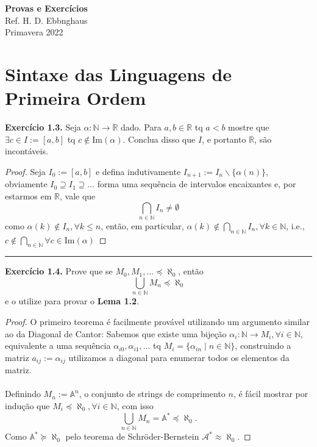 \documentclass[11pt]{article}
\theoremstyle{definition}
\newcommand{\mc}[1]{\mathcal{#1}}
\newcommand{\mbb}[1]{\mathbb{#1}}
\begin{document}
\setcounter{section}{0}
\thispagestyle{empty}

\begin{center}
{\LARGE \bf Provas e Exercícios}\\
{\large Ref. H. D. Ebbnghaus}\\
Primavera 2022
\end{center}

\tableofcontents

\section{Sintaxe das Linguagens de Primeira Ordem}

\textbf{Exercício 1.3.}
Seja $\alpha:\mbb{N}\to\mbb{R}$ dado. Para $a,b\in\mbb{R}$ tq $a<b$ mostre que $\exists c\in I:=[a,b]$ tq $c\notin\text{Im}(\alpha)$. Conclua disso que $I$, e portanto $\mbb{R}$, são incontáveis.
\begin{proof}
    Seja $I_0:=[a,b]$ e defina indutivamente $I_{n+1}:=I_n\backslash\{\alpha(n)\}$, obviamente $I_0 \supseteq I_1 \supseteq \dots$ forma uma sequência de intervalos encaixantes e, por estarmos em $\mbb{R}$, vale que
    $$\bigcap_{n\in\mbb{N}}I_n\ne\emptyset$$
    como $\alpha(k)\notin  I_n,\forall k\le n$, então, em particular, $\alpha(k)\notin\bigcap_{n\in\mbb{N}}I_n, \forall k\in\mbb{N}$, i.e., $c\notin\bigcap_{n\in\mbb{N}}\forall c\in\text{Im}(\alpha)$
\end{proof}

\hrule

\textbf{Exercício 1.4.}
Prove que se $M_0,M_1,\dots\preceq\aleph_0$, então
\[
\bigcup_{n\in\mbb{N}}M_n\preceq\aleph_0
\]
e o utilize para provar o \textbf{Lema 1.2}.
\begin{proof}
    O primeiro teorema é facilmente provável utilizando um argumento similar ao da Diagonal de Cantor: Sabemos que existe uma bijeção $\alpha_i:\mbb{N}\to M_i,\forall i\in\mbb{N}$, equivalente a uma sequência $\alpha_{i0},\alpha_{i1},\dots$ tq $M_i=\{\alpha_{in}\mid n\in\mbb{N}\}$, construindo a matriz $a_{ij}:=\alpha_{ij}$ utilizamos a diagonal para enumerar todos os elementos da matriz.\\\\
    Definindo $M_n:=\mbb{A}^n$, o conjunto de strings de comprimento $n$, é fácil mostrar por indução que $M_i\preceq\aleph_0, \forall i\in\mbb{N}$, com isso
    \[
    \bigcup_{n\in\mbb{N}}M_n=\mbb{A}^*\preceq\aleph_0.
    \]
    Como $\mbb{A}^*\succeq\aleph_0$ pelo teorema de Schröder-Bernstein $\mc{A}^*\approx\aleph_0$.
\end{proof}
\end{document}
